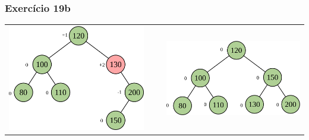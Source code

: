 \documentclass[aspectratio=169]{beamer}
\begin{document}
\begin{frame}[fragile]\frametitle{Exercício 19b}
\begin{tabular}{lll}
\includegraphics[height=0.45\paperheight]{imagens/avl18c.png} & ~ ~ &
\includegraphics[height=0.33\paperheight]{imagens/avl18d.png} \\
\end{tabular}
\end{frame}
\end{document}
